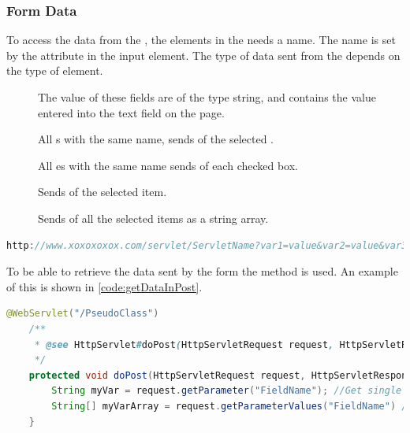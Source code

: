 \subsubsection{Form Data}
To access the data from the , the elements in the  needs a name. The name is set by the  attribute in the input element. The type of data sent from the  depends on the type of element.
\begin{description}
	\item[] The value of these fields are of the type string, and contains the value entered into the text field on the page.
	\item[] All s with the same name, sends  of the selected .
	\item[] All es with the same name sends  of each checked box.
	\item[] Sends  of the selected item.
	\item[] Sends  of all the selected items as a string array.
\end{description}

\begin{lstlisting}[language=Java,label=code:URLLINK,caption=URL with visible parameters]
http://www.xoxoxoxox.com/servlet/ServletName?var1=value&var2=value&var3=value
\end{lstlisting}

To be able to retrieve the data sent by the form the  method is used. An example of this is shown in \autoref{code:getDataInPost}.

\begin{lstlisting}[language=Java,label=code:getDataInPost,caption=How to read parameters]
	@WebServlet("/PseudoClass")
	/**
	 * @see HttpServlet#doPost(HttpServletRequest request, HttpServletResponse response)
	 */
	protected void doPost(HttpServletRequest request, HttpServletResponse response) throws ServletException, IOException {
		String myVar = request.getParameter("FieldName"); //Get single Value
		String[] myVarArray = request.getParameterValues("FieldName") //Get string array
	}
\end{lstlisting}

